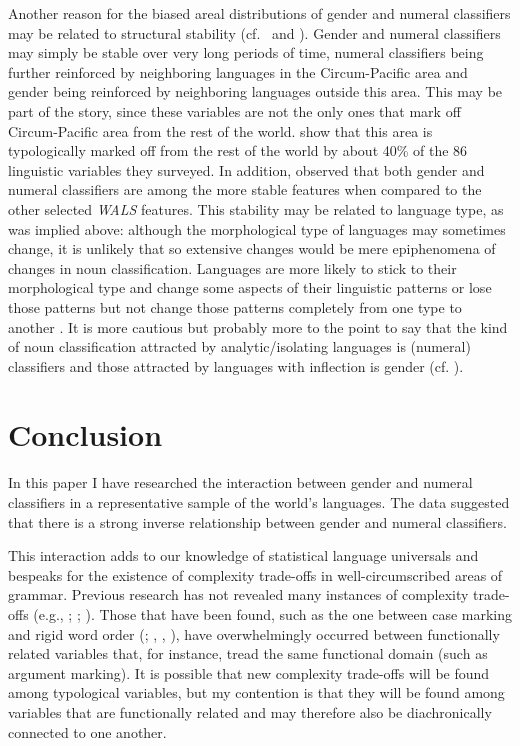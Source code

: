 \documentclass[output=collectionpaper]{langsci/langscibook}
\begin{document}
Another reason for the biased areal distributions of gender and numeral classifiers may be related to structural stability (cf.\  and \citealt[196--202]{Dahl2004}). Gender and numeral classifiers may simply be stable over very long periods of time, numeral classifiers being further reinforced by neighboring languages in the Circum-Pacific area and gender being reinforced by neighboring languages outside this area. This may be part of the story, since these variables are not the only ones that mark off Circum-Pacific area from the rest of the world. \citet{Bickel2006} show that this area is typologically marked off from the rest of the world by about 40\% of the 86 linguistic variables they surveyed. In addition, \citet[13]{Dediu2013} observed that both gender and numeral classifiers are among the more stable features when compared to the other selected \textit{WALS} features. This stability may be related to language type, as was implied above: although the morphological type of languages may sometimes change, it is unlikely that so extensive changes would be mere epiphenomena of changes in noun classification. Languages are more likely to stick to their morphological type and change some aspects of their linguistic patterns or lose those patterns but not change those patterns completely from one type to another \citep[346]{Passer2016b}. It is more cautious but probably more to the point to say that the kind of noun classification attracted by analytic/isolating languages is (numeral) classifiers and those attracted by languages with inflection is gender (cf. \citealt[137]{Corbett1991}).


\section{Conclusion}
\label{sec:Sinne:6}

In this paper I have researched the interaction between gender and numeral classifiers in a representative sample of the world's languages. The data suggested that there is a strong inverse relationship between gender and numeral classifiers.

This interaction adds to our knowledge of statistical language universals and bespeaks for the existence of complexity trade-offs in well-circumscribed areas of grammar. Previous research has not revealed many instances of complexity trade-offs (e.g., \citealt{Shosted2006}; \citealt{Maddieson2006}; \citealt{Miestamo2009}). Those that have been found, such as the one between case marking and rigid word order (\citealt{Siewierska1998}; \citealt{Sinnemaeki2008}, \citealt{Sinnemaeki2011}, \citealt{Sinnemaeki2014}), have overwhelmingly occurred between functionally related variables that, for instance, tread the same functional domain (such as argument marking). It is possible that new complexity trade-offs will be found among typological variables, but my contention is that they will be found among variables that are functionally related and may therefore also be diachronically connected to one another.
\end{document}
